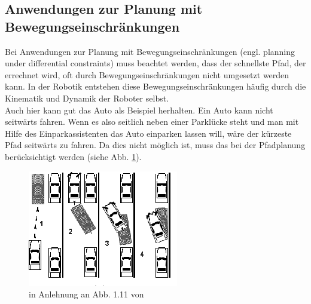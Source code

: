 \subsection{Anwendungen zur Planung mit Bewegungseinschränkungen}
Bei Anwendungen zur Planung mit Bewegungseinschränkungen (engl. planning under differential constraints) muss beachtet werden, dass der schnellste Pfad, der errechnet wird, oft durch Bewegungseinschränkungen nicht umgesetzt werden kann. In der Robotik entstehen diese Bewegungseinschränkungen häufig durch die Kinematik und Dynamik der Roboter selbst.\\
Auch hier kann gut das Auto als Beispiel herhalten. Ein Auto kann nicht seitwärts fahren. Wenn es also seitlich neben einer Parklücke steht und man mit Hilfe des Einparkassistenten das Auto einparken lassen will, wäre der kürzeste Pfad seitwärts zu fahren. Da dies nicht möglich ist, muss das bei der Pfadplanung berücksichtigt werden (siehe Abb. \ref{Abb. 5.3}).
\begin{figure}
	\centering
	\includegraphics[width=0.5\linewidth]{images/img239}
	\caption{in Anlehnung an Abb. 1.11 von \cite[~S. 15]{Lav06}}
	\label{Abb. 5.3}
\end{figure}

